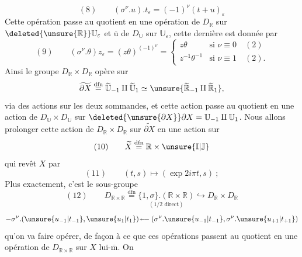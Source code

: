 \[
(8)\qquad (\sigma^\nu.u).t_\varepsilon=(-1)^\nu(t+u)_\varepsilon
\]
Cette opération passe au quotient en une opération de $D_{\mathbb R}$ sur $\deleted{\unsure{\mathbb R}}\mathbb U_\varepsilon$ et $\overline{\mathrm u}$ de $D_{\mathbb U}$ sur $\mathbb U_\varepsilon$, cette dernière est donnée par
\[
(9)\qquad (\sigma^\nu.\theta)z_\varepsilon=(z\theta)^{(-1)^\nu}=\left\{\begin{array}{ll}
z\theta&\text{si }\nu\equiv0\quad(2)\\
z^{-1}\theta^{-1}&\text{si }\nu\equiv1\quad(2).
\end{array}\right.
\]
Ainsi le groupe $D_{\mathbb R}\times D_{\mathbb R}$ opère sur
\[
\widetilde{\partial X}\overset{\mathrm{dfn}}{=}\widetilde{\mathbb U}_{-1}\amalg\widetilde{\mathbb U}_1\simeq\unsure{\widetilde{\mathbb R}_{-1}\amalg\widetilde{\mathbb R}_1},
\]
via des actions sur les deux sommandes, et cette action passe au quotient en une action de $D_{\mathbb U}\times D_{\mathbb U}$ sur $\deleted{\unsure{\partial X}}\partial X=\mathbb U_{-1}\amalg\mathbb U_1$. Nous allons prolonger cette action de $D_{\mathbb R}\times D_{\mathbb R}$ sur $\widetilde{\partial X}$ en une action sur
\[
(10)\qquad \widetilde X\overset{\mathrm{dfn}}{=}\mathbb R\times\unsure{\mathbb I|\mathbb J}
\]
qui revêt $X$ par
\[
(11)\qquad (t,s)\longmapsto(\exp2i\pi t,s)\ ;
\]
 Plus exactement, c'est le sous-groupe
\[
(12)\qquad D_{\mathbb R\times\mathbb R}\overset{\mathrm{dfn}}{=}\underset{(1/2\text{ direct})}{\{1,\sigma\}.(\mathbb R\times\mathbb R)}\hookrightarrow D_{\mathbb R}\times D_{\mathbb R}
\]
\[
-\sigma^\nu.(\unsure{u_{-1}|t_{-1}},\unsure{u_1|t_1})\mathbin{\mapstochar\!\relbar\!\relbar}(\sigma^\nu.\unsure{u_{-1}|t_{-1}},\sigma^\nu.\unsure{u_{+1}|t_{+1}})
\]
qu'on va faire opérer, de façon à ce que ces opérations passent au quotient en une opération de $D_{\mathbb R\times\mathbb R}$ sur $X$ lui-$\overline{\mathrm m}$. On


